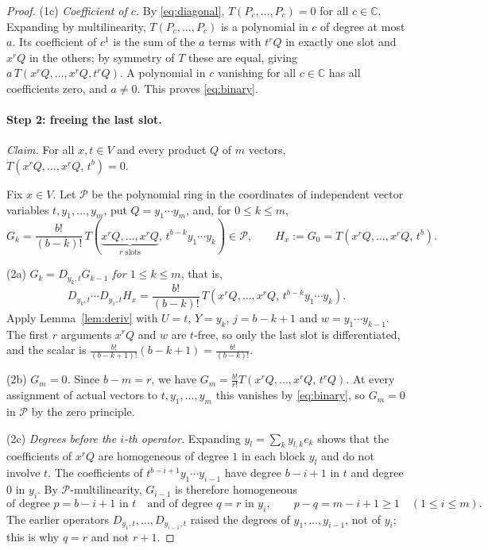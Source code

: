 \documentclass[11pt]{article}
\theoremstyle{remark}
\newcommand{\C}{\mathbb C}
\newcommand{\D}[2]{D_{#1,#2}}
\newcommand{\PP}{\mathcal P}
\begin{document}
\begin{proof}
(1c) \emph{Coefficient of $c$.} By \eqref{eq:diagonal},
$T(P_c,\dots,P_c)=0$ for all $c\in\C$. Expanding by multilinearity,
$T(P_c,\dots,P_c)$ is a polynomial in $c$ of degree at most $a$. Its
coefficient of $c^1$ is the sum of the $a$ terms with $t^rQ$ in exactly one
slot and $x^rQ$ in the others; by symmetry of $T$ these are equal, giving
$a\,T(x^rQ,\ldots,x^rQ,t^rQ)$. A polynomial in $c$ vanishing for all
$c\in\C$ has all coefficients zero, and $a\ne0$. This proves
\eqref{eq:binary}.

\paragraph{Step 2: freeing the last slot.}
\emph{Claim.} For all $x,t\in V$ and every product $Q$ of $m$ vectors,
$T(x^rQ,\ldots,x^rQ,\,t^b)=0$.

Fix $x\in V$. Let $\PP$ be the polynomial ring in the coordinates of
independent vector variables $t,y_1,\ldots,y_m$, put $Q=y_1\cdots y_m$, and,
for $0\le k\le m$,
\[
 G_k=\frac{b!}{(b-k)!}\,
 T(\underbrace{x^rQ,\ldots,x^rQ}_{r\text{ slots}},\,t^{b-k}y_1\cdots y_k)
 \in\PP,\qquad H_x:=G_0=T(x^rQ,\ldots,x^rQ,\,t^b).
\]

(2a) \emph{$G_k=\D{y_k}{t}G_{k-1}$ for $1\le k\le m$}, that is,
\begin{equation}\label{eq:first-composition}
 \D{y_k}{t}\cdots\D{y_1}{t}H_x
 =\frac{b!}{(b-k)!}\,
 T(x^rQ,\ldots,x^rQ,\,t^{b-k}y_1\cdots y_k).
\end{equation}
Apply Lemma~\ref{lem:deriv} with $U=t$, $Y=y_k$, $j=b-k+1$ and
$w=y_1\cdots y_{k-1}$. The first $r$ arguments $x^rQ$ and $w$ are $t$-free,
so only the last slot is differentiated, and the scalar is
$\frac{b!}{(b-k+1)!}(b-k+1)=\frac{b!}{(b-k)!}$.

(2b) \emph{$G_m=0$.} Since $b-m=r$, we have
$G_m=\frac{b!}{r!}T(x^rQ,\ldots,x^rQ,\,t^rQ)$. At every assignment of
actual vectors to $t,y_1,\dots,y_m$ this vanishes by \eqref{eq:binary}, so
$G_m=0$ in $\PP$ by the zero principle.

(2c) \emph{Degrees before the $i$-th operator.} Expanding
$y_l=\sum_ky_{l,k}e_k$ shows that the coefficients of $x^rQ$ are
homogeneous of degree $1$ in each block $y_l$ and do not involve $t$. The
coefficients of $t^{b-i+1}y_1\cdots y_{i-1}$ have degree $b-i+1$ in $t$ and
degree $0$ in $y_i$. By $\PP$-multilinearity, $G_{i-1}$ is therefore
homogeneous
\[
 \text{of degree }p=b-i+1\text{ in }t
 \quad\text{and of degree }q=r\text{ in }y_i,
 \qquad p-q=m-i+1\ge1\quad(1\le i\le m).
\]
The earlier operators $\D{y_1}{t},\dots,\D{y_{i-1}}{t}$ raised the degrees
of $y_1,\dots,y_{i-1}$, not of $y_i$; this is why $q=r$ and not $r+1$.


\end{proof}
\end{document}

